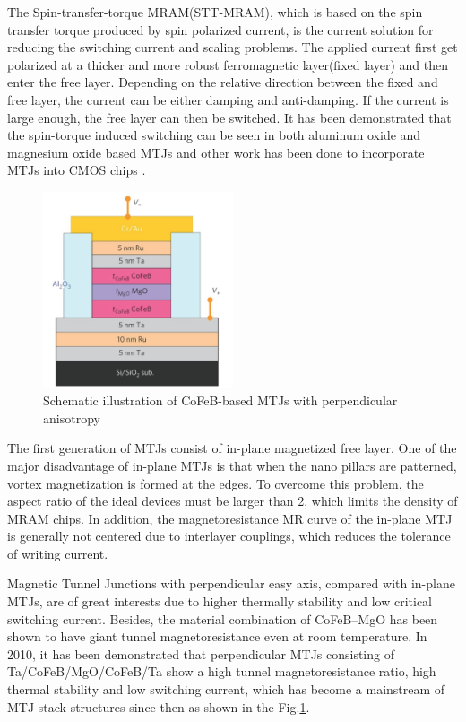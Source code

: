 The Spin-transfer-torque MRAM(STT-MRAM), which is based on the spin transfer torque produced by spin polarized current, is the current solution for reducing the switching current and scaling problems. The applied current first get polarized at a thicker and more robust ferromagnetic layer(fixed layer) and then enter the free layer. Depending on the relative direction between the fixed and free layer, the current can be either damping and anti-damping. If the current is large enough, the free layer can then be switched. It has been demonstrated that the spin-torque induced switching can be seen in both aluminum oxide and magnesium oxide based MTJs\cite{STTSwitchingMTJ1}\cite{STTSwitchingMTJ2} and other work has been done to incorporate MTJs into CMOS chips\cite{MTJIBM} \cite{MTJIBM2}\cite{MRAMMTJs}.


\begin{figure}[h!]
\centering
\includegraphics[width=0.5\textwidth]{fig/MTJ/MTJStack}
\caption{ Schematic illustration of CoFeB-based MTJs with perpendicular anisotropy}
\label{fig:MTJStack}
\end{figure}



The first generation of MTJs consist of in-plane magnetized free layer. One of the major disadvantage of in-plane MTJs is that when the nano pillars are patterned, vortex magnetization is formed at the edges\cite{vortex1}\cite{vortex2}. To overcome this problem, the aspect ratio of the ideal devices must be larger than 2\cite{vortex3}, which limits the density of MRAM chips. In addition, the magnetoresistance  MR  curve of the in-plane MTJ is generally not centered due to interlayer couplings\cite{inplaneswitching}, which reduces the tolerance of writing current.


Magnetic Tunnel Junctions with perpendicular easy axis, compared with in-plane MTJs, are of great interests due to higher thermally stability and low critical switching current\cite{PMA1}\cite{PMA3}\cite{PMA2}. Besides, the material combination of CoFeB–MgO has been shown to have giant tunnel magnetoresistance even at room temperature\cite{GiantTMR}\cite{GiantTMR2}\cite{GiantTMR3}. In 2010, it has been demonstrated that perpendicular MTJs consisting of Ta/CoFeB/MgO/CoFeB/Ta show a high tunnel magnetoresistance ratio, high thermal stability and low switching current\cite{MTJPMA}, which has become a mainstream of MTJ stack structures since then as shown in the
	Fig.\ref{fig:MTJStack}.



